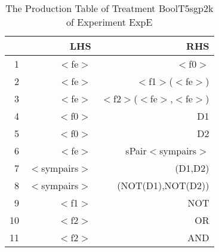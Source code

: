 \begin{table}[ht]
\centering
\begin{tabular}{rrr}
  \hline
 & LHS & RHS \\ 
  \hline
1 & $<$fe$>$ & $<$f0$>$ \\ 
  2 & $<$fe$>$ & $<$f1$>$($<$fe$>$) \\ 
  3 & $<$fe$>$ & $<$f2$>$($<$fe$>$,$<$fe$>$) \\ 
  4 & $<$f0$>$ & D1 \\ 
  5 & $<$f0$>$ & D2 \\ 
  6 & $<$fe$>$ & sPair$<$sympairs$>$ \\ 
  7 & $<$sympairs$>$ & (D1,D2) \\ 
  8 & $<$sympairs$>$ & (NOT(D1),NOT(D2)) \\ 
  9 & $<$f1$>$ & NOT \\ 
  10 & $<$f2$>$ & OR \\ 
  11 & $<$f2$>$ & AND \\ 
   \hline
\end{tabular}
\caption{The Production Table of Treatment BoolT5sgp2k of Experiment ExpE} 
\end{table}
